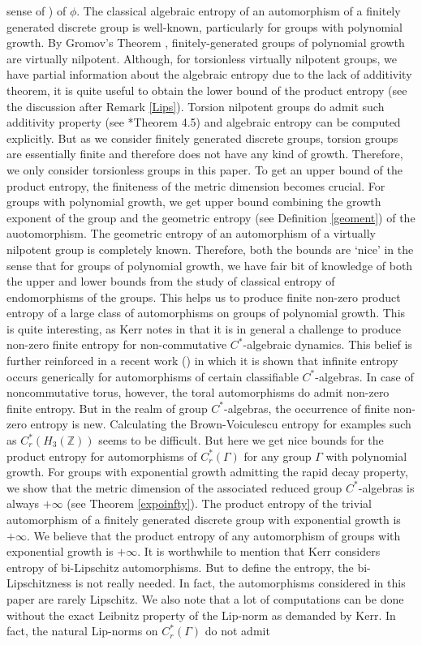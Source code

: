 \documentclass[a4paper,11pt,reqno]{amsart}
\theoremstyle{plain}
\theoremstyle{mainthmstyle}
\theoremstyle{named}
\numberwithin{equation}{section}
\begin{document}
sense of \cite{MR2491886}) of $\phi$. The classical algebraic entropy of an automorphism of a finitely generated discrete group is well-known, particularly for groups with polynomial growth. By Gromov's Theorem \cite{MR623534}, finitely-generated groups of polynomial growth are virtually nilpotent. Although, for torsionless virtually nilpotent groups, we have partial information about the algebraic entropy due to the lack of additivity theorem, it is quite useful to obtain the lower bound of the product entropy (see the discussion after Remark \ref{Lips}). Torsion nilpotent groups do admit such additivity property (see \cite{shlossberg2026addition}*{Theorem 4.5}) and algebraic entropy can be computed explicitly. But as we consider finitely generated discrete groups, torsion groups are essentially finite and therefore does not have any kind of growth. Therefore, we only consider torsionless groups in this paper. To get an upper bound of the product entropy, the finiteness of the metric dimension becomes crucial. For groups with polynomial growth, we get upper bound combining the growth exponent of the group and the geometric entropy (see Definition \ref{geoment}) of the auotomorphism. The geometric entropy of an automorphism of a virtually nilpotent group is completely known. Therefore, both the bounds are `nice' in the sense that for groups of polynomial growth, we have fair bit of knowledge of both the upper and lower bounds from the study of classical entropy of endomorphisms of the groups. This helps us to produce finite non-zero product entropy of a large class of automorphisms on groups of polynomial growth.  This is quite interesting, as Kerr notes in \cite{Kerr2} that it is in general a challenge to produce non-zero finite entropy for non-commutative $C^{\ast}$-algebraic dynamics. This belief is further reinforced in a recent work (\cite{new2025}) in which it is shown that infinite entropy occurs generically for automorphisms of certain classifiable $C^{\ast}$-algebras. In case of noncommutative torus, however, the toral automorphisms do admit non-zero finite entropy. But in the realm of group $C^{\ast}$-algebras, the occurrence of finite non-zero entropy is new. Calculating the Brown-Voiculescu entropy for examples such as $C^{\ast}_{r}(H_3 (\mathbb Z))$ seems to be difficult. But here we get nice bounds for the product entropy for automorphisms of $C^{\ast}_{r}(\Gamma)$ for any group $\Gamma$ with polynomial growth. For groups with exponential growth admitting the rapid decay property, we show that the metric dimension of the associated reduced group $C^{\ast}$-algebras is always $+\infty$ (see Theorem \ref{expoinfty}). The product entropy of the trivial automorphism of a finitely generated discrete group with exponential growth is $+\infty$. We believe that the product entropy of any automorphism of groups with exponential growth is $+\infty$. It is worthwhile to mention that Kerr considers entropy of bi-Lipschitz automorphisms. But to define the entropy, the bi-Lipschitzness is not really needed. In fact, the automorphisms considered in this paper are rarely Lipschitz.  We also note that a lot of computations can be done without the exact Leibnitz property of the Lip-norm as demanded by Kerr. In fact, the natural Lip-norms on $C^{\ast}_{r}(\Gamma)$ do not admit 
\end{document}
